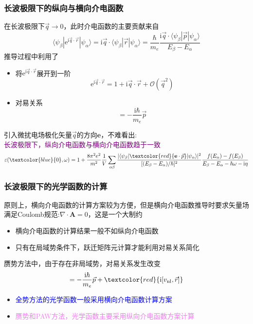 \frame
{
	\frametitle{长波极限下的纵向与横向介电函数}
	在长波极限下$\vec q\rightarrow0$，此时介电函数的主要贡献来自
	\begin{displaymath}
		\langle\psi_{\beta}|\mathrm{e}^{\mathrm{i}\vec q\cdot\vec r}|\psi_{\alpha}\rangle=\mathrm{i}\vec q\cdot\langle\psi_{\beta}|\vec r|\psi_{\alpha}\rangle=\frac{\hbar}{m_e}\frac{\mathrm{i}\vec q\cdot\langle\psi_{\beta}|\vec p|\psi_{\alpha}\rangle}{E_{\beta}-E_{\alpha}}
	\end{displaymath}
	推导过程中利用了
	\begin{itemize}
		\item 将$\mathrm{e}^{\mathrm{i}\vec q\cdot\vec r}$展开到一阶
			\begin{displaymath}
				\mathrm{e}^{\mathrm{i}\vec q\cdot\vec r}=1+\mathrm{i}\vec q\cdot\vec r+\mathcal{O}(\vec q^2)
			\end{displaymath}
		\item 对易关系
			\begin{displaymath}
				[H_0,\vec r]=-\frac{\mathrm{i}\hbar}{m_e}\vec p
			\end{displaymath}
	\end{itemize}
	引入微扰电场极化矢量$\vec q$的方向$\mathbf{e}$，不难看出:\\
	\textcolor{purple}{长波极限下，纵向介电函数与横向介电函数趋于一致}
	\begin{displaymath}
		\varepsilon(\textcolor{blue}{0},\omega)=1+\frac{8\pi^2e^2}{m^2}\frac1V\sum_{\alpha\beta}\frac{|\langle\psi_{\beta}|\textcolor{red}{\mathbf{e}\cdot\vec p}|\psi_{\alpha}\rangle|^2}{[(E_{\beta}-E_{\alpha})/\hbar]^2}\frac{f(E_{\alpha})-f(E_{\beta})}{E_{\beta}-E_{\alpha}-\hbar\omega-\mathrm{i}\eta}
	\end{displaymath}
}

\frame
{
	\frametitle{长波极限下的光学函数的计算}
	原则上，横向介电函数的计算方案较为方便，但是横向介电函数推导时要求矢量场满足\textrm{Coulomb}规范:$\nabla\cdot\mathbf{A}=0$，这是一个大制约
	\begin{itemize}
		\item 横向介电函数的计算结果一般不如纵向介电函数
		\item 只有在局域势条件下，跃迁矩阵元计算才能利用对易关系简化
	\end{itemize}
	赝势方法中，由于存在非局域势，对易关系发生改变
	\begin{displaymath}
		[H,\vec r]=-\frac{\mathrm{i}\hbar}{m_e}\vec p+\textcolor{red}{\mathrm{i}[v_{\mathrm{nl}},\vec r]}
	\end{displaymath}
	\begin{itemize}
		\item \textcolor{blue}{全势方法的光学函数一般采用横向介电函数计算方案}
		\item \textcolor{violet}{赝势和\textrm{PAW}方法，光学函数主要采用纵向介电函数方案计算}
	\end{itemize}
}

